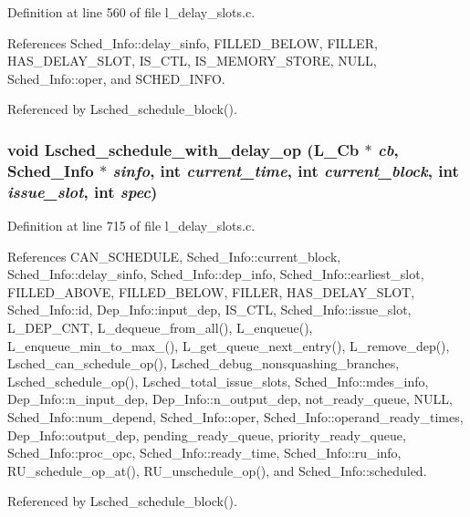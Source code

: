 Definition at line 560 of file l\_\-delay\_\-slots.c.

References Sched\_\-Info::delay\_\-sinfo, FILLED\_\-BELOW, FILLER, HAS\_\-DELAY\_\-SLOT, IS\_\-CTL, IS\_\-MEMORY\_\-STORE, NULL, Sched\_\-Info::oper, and SCHED\_\-INFO.

Referenced by Lsched\_\-schedule\_\-block().
\subsubsection{\setlength{\rightskip}{0pt plus 5cm}void Lsched\_\-schedule\_\-with\_\-delay\_\-op (L\_\-Cb $\ast$ {\em cb}, \bf{Sched\_\-Info} $\ast$ {\em sinfo}, int {\em current\_\-time}, int {\em current\_\-block}, int {\em issue\_\-slot}, int {\em spec})}\label{l__delay__slots_8c_36e2138d405088ad97ffca6e7832e401}




Definition at line 715 of file l\_\-delay\_\-slots.c.

References CAN\_\-SCHEDULE, Sched\_\-Info::current\_\-block, Sched\_\-Info::delay\_\-sinfo, Sched\_\-Info::dep\_\-info, Sched\_\-Info::earliest\_\-slot, FILLED\_\-ABOVE, FILLED\_\-BELOW, FILLER, HAS\_\-DELAY\_\-SLOT, Sched\_\-Info::id, Dep\_\-Info::input\_\-dep, IS\_\-CTL, Sched\_\-Info::issue\_\-slot, L\_\-DEP\_\-CNT, L\_\-dequeue\_\-from\_\-all(), L\_\-enqueue(), L\_\-enqueue\_\-min\_\-to\_\-max\_(), L\_\-get\_\-queue\_\-next\_\-entry(), L\_\-remove\_\-dep(), Lsched\_\-can\_\-schedule\_\-op(), Lsched\_\-debug\_\-nonsquashing\_\-branches, Lsched\_\-schedule\_\-op(), Lsched\_\-total\_\-issue\_\-slots, Sched\_\-Info::mdes\_\-info, Dep\_\-Info::n\_\-input\_\-dep, Dep\_\-Info::n\_\-output\_\-dep, not\_\-ready\_\-queue, NULL, Sched\_\-Info::num\_\-depend, Sched\_\-Info::oper, Sched\_\-Info::operand\_\-ready\_\-times, Dep\_\-Info::output\_\-dep, pending\_\-ready\_\-queue, priority\_\-ready\_\-queue, Sched\_\-Info::proc\_\-opc, Sched\_\-Info::ready\_\-time, Sched\_\-Info::ru\_\-info, RU\_\-schedule\_\-op\_\-at(), RU\_\-unschedule\_\-op(), and Sched\_\-Info::scheduled.

Referenced by Lsched\_\-schedule\_\-block().
